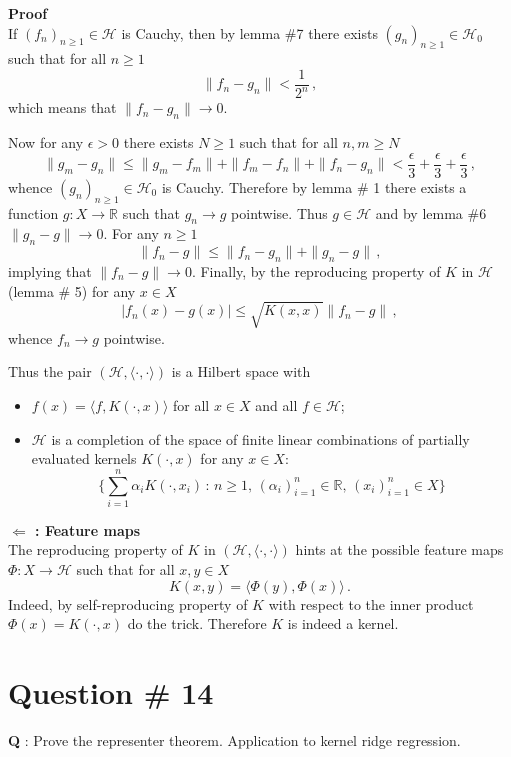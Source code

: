 \documentclass[a4paper]{article}
\newcommand{\Real}{\mathbb{R}}
\newcommand{\Hcal}{\mathcal{H}}
\begin{document}
\noindent\textbf{Proof} \hfill \\
If $(f_n)_{n\geq1}\in\Hcal$ is Cauchy, then by lemma \#7 there exists $(g_n)_{n\geq1}\in \Hcal_0$
such that for all $n\geq1$
\[ \|f_n - g_n\| < \frac{1}{2^n} \,, \]
which means that $\| f_n - g_n \| \to 0$.

Now for any $\epsilon>0$ there exists $N\geq1$ such that for all $n,m\geq N$
\[ \| g_m - g_n \|
		\leq \| g_m - f_m \| + \| f_m - f_n \| + \| f_n - g_n \|
		< \frac{\epsilon}{3} + \frac{\epsilon}{3} + \frac{\epsilon}{3} \,,
\]
whence $(g_n)_{n\geq1}\in \Hcal_0$ is Cauchy. Therefore by lemma \# 1 there exists
a function $g : X\to \Real$ such that $g_n\to g$ pointwise. Thus $g\in \Hcal$ and
by lemma \#6 $\|g_n - g\| \to 0$. For any $n\geq 1$
\[ \|f_n - g\| \leq \|f_n - g_n\| + \|g_n - g\| \,, \]
implying that $\|f_n - g\| \to 0$. Finally, by the reproducing property of $K$
in $\Hcal$ (lemma \# 5) for any $x\in X$
\[ |f_n(x) - g(x) | \leq \sqrt{K(x,x)} \|f_n - g\|\,, \]
whence $f_n\to g$ pointwise.

Thus the pair $(\Hcal,\langle\cdot,\cdot\rangle)$ is a Hilbert space with \begin{itemize}
	\item $f(x) = \langle f, K(\cdot, x)\rangle$ for all $x\in X$ and all $f\in\Hcal$;
	\item $\Hcal$ is a completion of the space of finite linear combinations of
	partially evaluated kernels $K(\cdot,x)$ for any $x\in X$:
	\[ \bigl\{ \sum_{i=1}^n \alpha_i K(\cdot,x_i)\,:\,n\geq1,\,(\alpha_i)_{i=1}^n\in \Real,\,(x_i)_{i=1}^n\in X \bigr\} \]
\end{itemize}

\noindent \textbf{ $\Leftarrow$ : Feature maps}\hfill\\
The reproducing property of $K$ in $(\Hcal,\langle\cdot,\cdot\rangle)$ hints at
the possible feature maps $\Phi:X\to \Hcal$ such that for all $x,y\in X$
\[ K(x,y) = \langle \Phi(y), \Phi(x)\rangle\,. \]
Indeed, by self-reproducing property of $K$ with respect to the inner product
$\Phi(x) = K(\cdot,x)$ do the trick. Therefore $K$ is indeed a kernel.

\clearpage

\section[Representer]{Question \# 14} %
\label{sec:question_14}
\textbf{\large \textbf{Q}} : Prove the representer theorem. Application to kernel
ridge regression.
\end{document}
